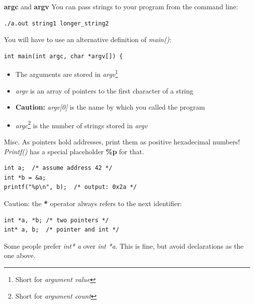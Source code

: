\begin{frame}[fragile]{\textbf{argc} and \textbf{argv}}
	You can pass strings to your program from the command line:
	\begin{lstlisting}[numbers=none]
./a.out string1 longer_string2
\end{lstlisting}
	\bigskip
	You will have to use an alternative definition of \textit{main()}:
	\begin{lstlisting}[numbers=none]
int main(int argc, char *argv[]) {
\end{lstlisting}
	\begin{itemize}
		\item The arguments are stored in \textit{argv}\footnote{Short for \textit{argument value}}
		\item \textit{argv} is an array of pointers to the first character of a string
		\item \textbf{Caution:} \textit{argv[0]} is the name by which you called the program
		\item \textit{argc}\footnote{Short for \textit{argument count}} is the number of strings stored in \textit{argv}
	\end{itemize}
\end{frame}


\begin{frame}[fragile]{Misc.}
	As pointers hold addresses, print them as positive hexadecimal numbers!\\
	\textit{Printf()} has a special placeholder \textbf{\%p} for that.\\
	\begin{lstlisting}[numbers=none]
int a;	/* assume address 42 */
int *b = &a;
printf("%p\n", b);	/* output: 0x2a */
\end{lstlisting}
	\pause
	\bigskip
	Caution: the \textbf{*} operator always refers to the next identifier:
	\begin{lstlisting}[numbers=none]
int *a, *b;	/* two pointers */
int* a, b;	/* pointer and int */
\end{lstlisting}
	\bigskip
	Some people prefer \textit{int* a} over \textit{int *a}. This is fine, but avoid declarations as the one above. \only<3->{And keep it consistent.}
\end{frame}


